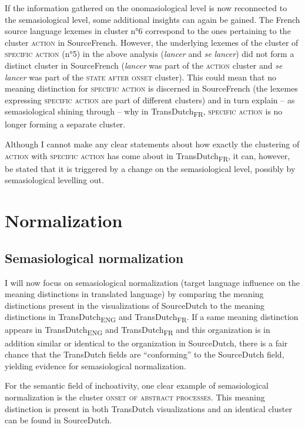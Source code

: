 If the information gathered on the onomasiological level is now reconnected to the semasiological level, some additional insights can again be gained. The French source language lexemes in cluster n°6 correspond to the ones pertaining to the cluster \textsc{action} in SourceFrench. However, the underlying lexemes of the cluster of {\textsc{specific}} \textsc{action} (n°5) in the above analysis (\textit{lancer} and \textit{se} \textit{lancer}) did not form a distinct cluster in SourceFrench (\textit{lancer} was part of the \textsc{action} cluster and \textit{se} \textit{lancer} was part of the \textsc{state after onset} cluster). This could mean that no meaning distinction for {\textsc{specific}} \textsc{action} is discerned in SourceFrench (the lexemes expressing {\textsc{specific}} \textsc{action} are part of different clusters) and in turn explain – as semasiological shining through – why in TransDutch\textsubscript{FR}, {\textsc{specific}} \textsc{action} is no longer forming a separate cluster.

Although I cannot make any clear statements about how exactly the clustering of \textsc{action} with {\textsc{specific}} \textsc{action} has come about in TransDutch\textsubscript{FR}, it can, however, be stated that it is triggered by a change on the semasiological level, possibly by semasiological levelling out.

\section{Normalization}\label{sec:4.7}  
\subsection{Semasiological normalization}\label{sec:4.7.1}  
I will now focus on semasiological normalization (target language influence on the meaning distinctions in translated language) by comparing the meaning distinctions present in the visualizations of SourceDutch to the meaning distinctions in TransDutch\textsubscript{ENG} and TransDutch\textsubscript{FR}. If a same meaning distinction appears in TransDutch\textsubscript{ENG} and TransDutch\textsubscript{FR} and this organization is in addition similar or identical to the organization in SourceDutch, there is a fair chance that the TransDutch fields are ``conforming'' to the SourceDutch field, yielding evidence for semasiological normalization.

For the semantic field of inchoativity, one clear example of semasiological normalization is the cluster {\textsc{onset of abstract processes}}. This meaning distinction is present in both TransDutch visualizations and an identical cluster can be found in SourceDutch.

